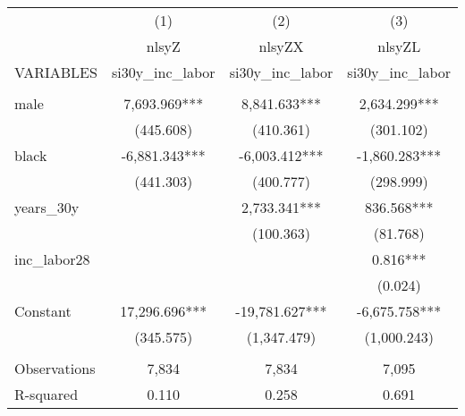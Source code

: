 \begin{tabular}{lccc} \hline
 & (1) & (2) & (3) \\
 & nlsyZ & nlsyZX & nlsyZL \\
VARIABLES & si30y\_inc\_labor & si30y\_inc\_labor & si30y\_inc\_labor \\ \hline
 &  &  &  \\
male & 7,693.969*** & 8,841.633*** & 2,634.299*** \\
 & (445.608) & (410.361) & (301.102) \\
black & -6,881.343*** & -6,003.412*** & -1,860.283*** \\
 & (441.303) & (400.777) & (298.999) \\
years\_30y &  & 2,733.341*** & 836.568*** \\
 &  & (100.363) & (81.768) \\
inc\_labor28 &  &  & 0.816*** \\
 &  &  & (0.024) \\
Constant & 17,296.696*** & -19,781.627*** & -6,675.758*** \\
 & (345.575) & (1,347.479) & (1,000.243) \\
 &  &  &  \\
Observations & 7,834 & 7,834 & 7,095 \\
 R-squared & 0.110 & 0.258 & 0.691 \\ \hline
\end{tabular}
